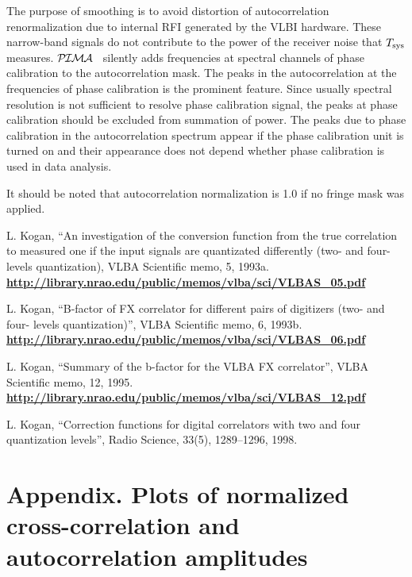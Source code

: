 \documentclass[11pt]{article}
\newcommand{\Blb}[1]{\textcolor{Dblue}{\bf #1}}
\newcommand{\web}[1]{\Blb{\url{#1}}}
\newcommand{\PIMA}{\textcolor{Dgreen}{$\cal P\hspace{-0.067em}I\hspace{-0.067em}M\hspace{-0.067em}A$} }
\begin{document}
   The purpose of smoothing is to avoid distortion of autocorrelation 
renormalization due to internal RFI generated by the VLBI hardware. These 
narrow-band signals do not contribute to the power of the receiver noise
that $T_{\rm sys}$ measures. \PIMA\ silently adds frequencies at spectral
channels of phase calibration to the autocorrelation mask. The peaks in
the autocorrelation at the frequencies of phase calibration is the prominent
feature. Since usually spectral resolution is not sufficient to resolve phase 
calibration signal, the peaks at phase calibration should be excluded from
summation of power. The peaks due to phase calibration in the autocorrelation
spectrum appear if the phase calibration unit is turned on and their 
appearance does not depend whether phase calibration is used in data analysis.

  It should be noted that autocorrelation normalization is 1.0 if no fringe
mask was applied.

\newpage
\begin{thebibliography}{99}

     L. Kogan, ``An investigation of the conversion function from the true
        correlation to measured one if the input signals are quantizated 
        differently (two- and four- levels quantization), VLBA Scientific memo, 5,
        1993a. \\
        \web{http://library.nrao.edu/public/memos/vlba/sci/VLBAS\_05.pdf}

     L. Kogan, ``B-factor of FX correlator for different pairs of digitizers 
        (two- and four- levels quantization)'', VLBA Scientific 
        memo, 6, 1993b. \\
        \web{http://library.nrao.edu/public/memos/vlba/sci/VLBAS\_06.pdf}

     L. Kogan, ``Summary of the b-factor for the VLBA FX correlator'',
        VLBA Scientific memo, 12, 1995. \\
        \web{http://library.nrao.edu/public/memos/vlba/sci/VLBAS\_12.pdf}

     L. Kogan, ``Correction functions for digital correlators with two
        and four quantization levels'', Radio Science, 
        33(5), 1289--1296, 1998.

\end{thebibliography}

\newpage
\appendix
\section{Appendix. Plots of normalized cross-correlation and autocorrelation 
amplitudes}
\end{document}
